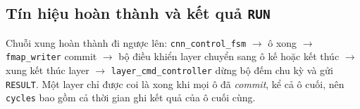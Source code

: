 \subsection{Tín hiệu hoàn thành và kết quả \texttt{RUN}}
Chuỗi xung hoàn thành đi ngược lên: \texttt{cnn\_control\_fsm} $\to$ ô xong $\to$ \texttt{fmap\_writer} commit $\to$ bộ điều khiển layer chuyển sang ô kế hoặc kết thúc $\to$ xung kết thúc layer $\to$ \texttt{layer\_cmd\_controller} dừng bộ đếm chu kỳ và gửi \texttt{RESULT}.
Một layer chỉ được coi là xong khi mọi ô đã \emph{commit}, kể cả ô cuối, nên \texttt{cycles} bao gồm cả thời gian ghi kết quả của ô cuối cùng.
